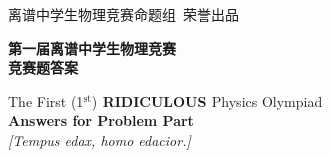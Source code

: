 \documentclass[10pt,a4paper,onecolumn,UTF8]{ctexart}
\begin{document}
	\newcommand{\ui}{\mathbbm{i}}
	\newcommand{\ud}{\mathrm{d}}
	\newcommand{\ue}{\mathbbm{e}}
	\newcommand{\uT}{\mathrm{T}}
	
	
	\pagestyle{fancy}
	\pagestyle{fancy}
	
	{\large 离谱中学生物理竞赛命题组\,\,\,荣誉出品}\\[3ex]
	
	
	
	\thispagestyle{empty}
	\begin{center}
		\textbf{\LARGE{第一届\;}}\textbf{\huge{离谱}}\textbf{\LARGE{\;中学生物理竞赛}}\\[6ex]
		
		\textbf{\Huge{竞赛题答案}}\\[14ex]
		
	\end{center}
	
	\begin{center}
		\Large{The First (1${}^{\text{st}}$)\;}\textbf{\LARGE{ RIDICULOUS }}\Large{\;Physics Olympiad}\\[5ex]
		
		\textbf{\huge{Answers for Problem Part}}\\[10ex]
		
		{\Large \textit{[Tempus edax, homo edacior.]}}\\[12ex]
		
	\end{center}
	
\end{document}
